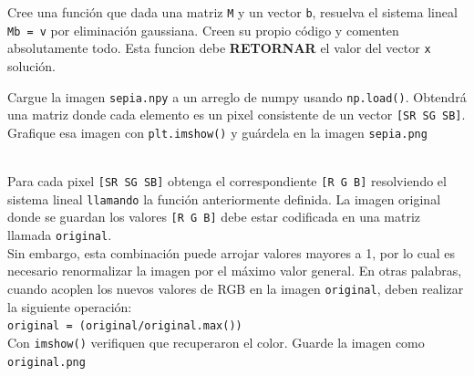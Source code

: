 \documentclass[11pt,letterpaper]{exam}
\begin{document}
\begin{questions}

Cree una funci\'on que dada una matriz \verb"M" y un vector \verb"b", resuelva el sistema lineal \verb"Mb = v" por eliminaci\'on gaussiana. Creen su propio c\'odigo y comenten absolutamente todo. Esta funcion debe \textbf{RETORNAR} el valor del vector \verb"x" soluci\'on.


Cargue la imagen \verb"sepia.npy" a un arreglo de numpy usando \verb"np.load()". Obtendr\'a una matriz donde cada elemento es un pixel consistente de un vector \verb"[SR SG SB]". Grafique esa imagen con \verb"plt.imshow()" y gu\'ardela en la imagen \verb"sepia.png" \\\


Para cada pixel \verb"[SR SG SB]" obtenga el correspondiente \verb"[R G B]" resolviendo el sistema lineal \verb"llamando" la funci\'on anteriormente definida. La imagen original donde se guardan los valores \verb"[R G B]" debe estar codificada en una matriz llamada \verb"original".\\

Sin embargo, esta combinaci\'on puede arrojar valores mayores a 1, por lo cual es necesario renormalizar la imagen por el m\'aximo valor general. En otras palabras, cuando acoplen los nuevos valores de RGB en la imagen \verb'original', deben realizar la siguiente operaci\'on:\\

\verb'original = (original/original.max())'\\

Con \verb"imshow()" verifiquen que recuperaron el color. Guarde la imagen como \verb"original.png"\\

\end{questions}
\end{document}
